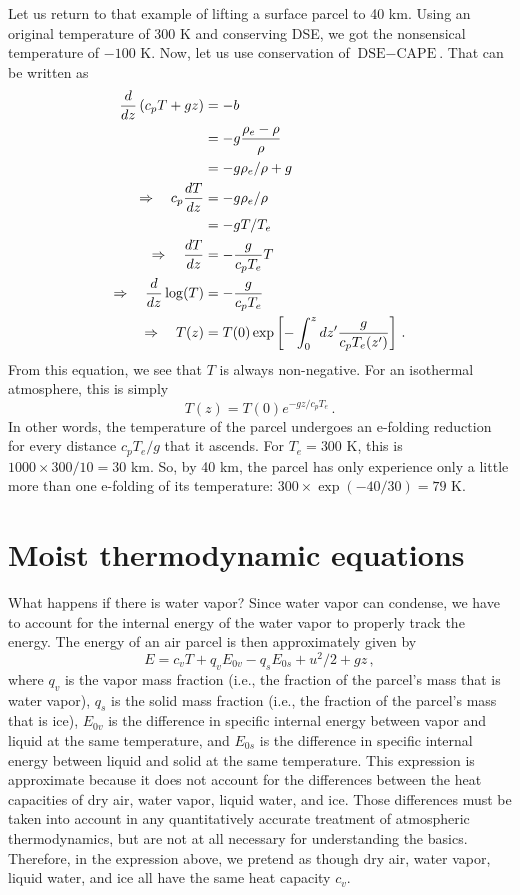 \documentclass[12pt]{article}
\newcommand{\dse}{{\text{DSE}}}
\begin{document}
Let us return to that example of lifting a surface parcel to 40 km.  Using an original temperature of 300 K and conserving DSE, we got the nonsensical temperature of $-100$ K.  Now, let us use conservation of $\dse{}-\text{CAPE}$.  That can be written as
\begin{align}
{\frac{d}{dz}} \left( c_p T + gz \right) &= -b \\
&= -g \frac{\rho_e - \rho}{\rho} \\
&= -g \rho_e/\rho + g \\
\Rightarrow \quad c_p \frac{dT}{dz} &= -g\rho_e/\rho \\
&= -g T/T_e \\
\Rightarrow \quad \frac{dT}{dz} &= -\frac{g}{c_p T_e} T \\
\Rightarrow \quad {\frac{d}{dz}} \log(T) &= -\frac{g}{c_p T_e} \\
\Rightarrow \quad T(z) &= T(0) \exp\left[ -\int_0^z dz' \frac{g}{c_p T_e(z')} \right] \, .
\end{align}
From this equation, we see that $T$ is always non-negative.  For an isothermal atmosphere, this is simply
\[
T(z) = T(0) e^{-gz/c_p T_e} \, .
\]
In other words, the temperature of the parcel undergoes an e-folding reduction for every distance $c_p T_e /g$ that it ascends.  For $T_e = 300$ K, this is $1000 \times 300 / 10 = 30$ km.  So, by 40 km, the parcel has only experience only a little more than one e-folding of its temperature: $300\times \exp(-40/30) = 79$ K.


\section{Moist thermodynamic equations}


What happens if there is water vapor?  Since water vapor can condense, we have to account for the internal energy of the water vapor to properly track the energy.  The energy of an air parcel is then approximately given by
\begin{equation}
E = c_v T + q_v E_{0v} - q_s E_{0s} + u^2/2 + gz \, ,
\end{equation}
where $q_v$ is the vapor mass fraction (i.e., the fraction of the parcel's mass that is water vapor), $q_s$ is the solid mass fraction (i.e., the fraction of the parcel's mass that is ice), $E_{0v}$ is the difference in specific internal energy between vapor and liquid at the same temperature, and $E_{0s}$ is the difference in specific internal energy between liquid and solid at the same temperature.  This expression is approximate because it does not account for the differences between the heat capacities of dry air, water vapor, liquid water, and ice.  Those differences must be taken into account in any quantitatively accurate treatment of atmospheric thermodynamics, but are not at all necessary for understanding the basics.  Therefore, in the expression above, we pretend as though dry air, water vapor, liquid water, and ice all have the same heat capacity $c_v$.
\end{document}
